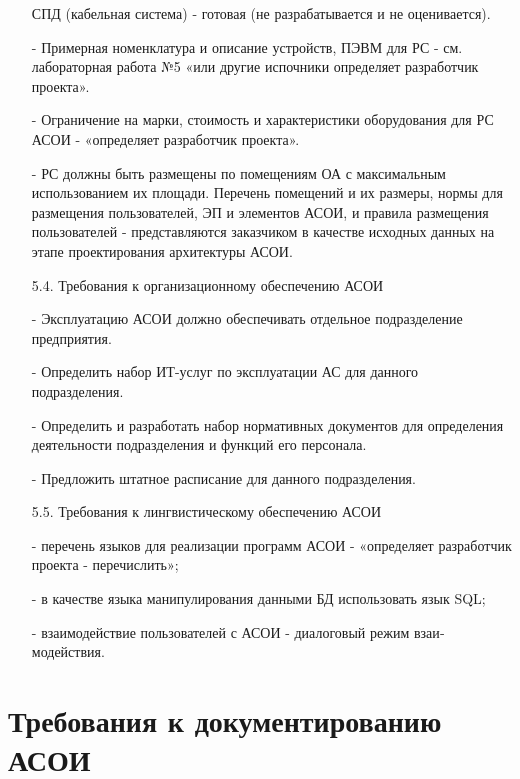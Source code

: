 \documentclass[12pt, a4paper, simple]{eskdtext}
\begin{document}
\begin{enumerate}
        СПД (кабельная система) - готовая (не разрабатывается и не оценивается).
        \item[-] Примерная номенклатура и описание устройств, ПЭВМ для РС - см. лабораторная работа №5
        «или другие испочники определяет разработчик проекта».
        \item[-] Ограничение на марки, стоимость и характеристики оборудования
        для РС АСОИ - «опреде­ляет разра­ботчик про­екта».
        \item[-] РС должны быть размещены по помещениям ОА с максимальным использованием их площади.
        Перечень помещений и их размеры, нормы для размещения пользователей, ЭП и элементов АСОИ,
        и правила размещения пользователей - представляются заказчиком в качестве исходных данных
        на этапе проектирования архитектуры АСОИ.
        \item[5.4.] Требования к организационному обеспечению АСОИ
        \item[-] Эксплуатацию АСОИ должно обеспечивать отдельное подразделение предприятия.
        \item[-] Определить набор ИТ-услуг по эксплуатации АС для данного подразделения.
        \item[-] Определить и разработать набор нормативных документов для определения деятельности подразделения
        и функций его персонала.
        \item[-] Предложить штатное расписание для данного подразделения.
        \item[5.5.] Требования к лингвистическому обеспечению АСОИ
        \item[-] перечень языков для реализации программ АСОИ - «опреде­ляет разра­ботчик про­екта - перечис­лить»;
        \item[-] в качестве языка манипулирования данными БД использовать язык SQL;
        \item[-] взаимодействие пользователей с АСОИ - диало­го­вый ре­жим взаи­модействия.
    \end{enumerate}

    \section{Требования к документированию АСОИ}
\end{document}
